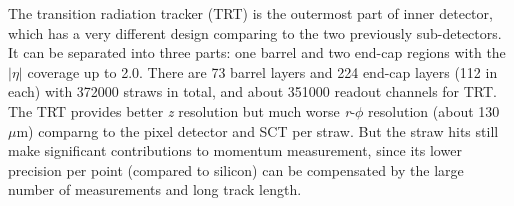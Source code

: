 The transition radiation tracker (TRT)\cite{TRT_2008} is the outermost part of inner detector, which has a very different design comparing to the two previously sub-detectors.
It can be separated into three parts: one barrel and two end-cap regions with the $|\eta|$ coverage up to 2.0.
There are 73 barrel layers and 224 end-cap layers (112 in each) with 372000 straws in total, and about 351000 readout channels for TRT.
The TRT provides better \textit{z} resolution but much worse \textit{r}-$\phi$ resolution (about 130 $\mu$m) comparng to the pixel detector and SCT per straw.
But the straw hits still make significant contributions to momentum measurement, since its lower precision per point (compared to silicon) can be compensated by the large number of measurements and long track length.

